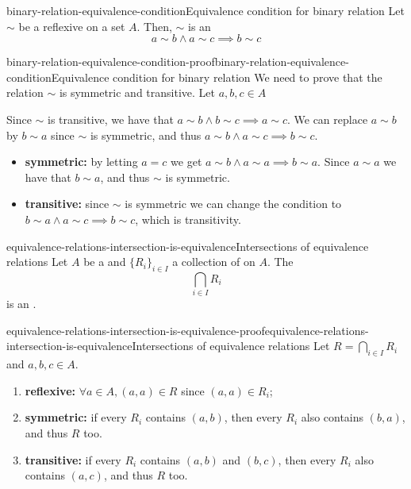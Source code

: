 \documentclass[preview]{standalone}
\begin{document}
\begin{snippetproposition}{binary-relation-equivalence-condition}{Equivalence condition for binary relation}
    Let \(\sim\) be a reflexive \binrelation on a set \(A\).
    Then, \(\sim\) is an \equivrelation \ifandonlyif
    \[ a\sim b \land a \sim c \implies b \sim c \]
\end{snippetproposition}

\begin{snippetproof}{binary-relation-equivalence-condition-proof}{binary-relation-equivalence-condition}{Equivalence condition for binary relation}
    We need to prove that the relation \(\sim\) is symmetric and transitive.
    Let \(a,b,c\in A\)
    \begin{iffproof}
        \item Since \(\sim\) is transitive, we have that \(a \sim b \land b \sim c \implies a \sim c\).
        We can replace \(a \sim b\) by \(b \sim a\) since \(\sim\) is symmetric, and thus
        \(a\sim b \land a \sim c \implies b \sim c\).
        \item \begin{itemize}
            \item \textbf{symmetric:} by letting \(a=c\) we get
            \(a\sim b \land a \sim a \implies b \sim a\). Since \(a\sim a\) we have that
            \(b \sim a\), and thus \(\sim\) is symmetric.
            \item \textbf{transitive:} since \(\sim\) is symmetric
                we can change the condition to \(b\sim a \land a \sim c \implies b \sim c\), which is
                transitivity.
        \end{itemize}
    \end{iffproof}
\end{snippetproof}

\begin{snippetproposition}{equivalence-relations-intersection-is-equivalence}{Intersections of equivalence relations}
    Let \(A\) be a \set and \(\{R_i\}_{i\in I}\) a collection of  on \(A\).
    The \binrelation
    \[ \bigcap_{i\in I} R_i \]
    is an \equivrelation.
\end{snippetproposition}

\begin{snippetproof}{equivalence-relations-intersection-is-equivalence-proof}{equivalence-relations-intersection-is-equivalence}{Intersections of equivalence relations}
    Let \( R=\bigcap_{i\in I} R_i \) and \(a,b,c\in A\).
    \begin{enumerate}
        \item \textbf{reflexive:} \(\forall a \in A, (a,a) \in R\) since \((a,a) \in R_i\);
        \item \textbf{symmetric:} if every \(R_i\) contains \((a,b)\), then every \(R_i\) also contains \((b,a)\),
            and thus \(R\) too. 
        \item \textbf{transitive:} if every \(R_i\) contains \((a,b)\) and \((b,c)\), then every \(R_i\)
            also contains \((a,c)\), and thus \(R\) too.
    \end{enumerate}
\end{snippetproof}
\end{document}
